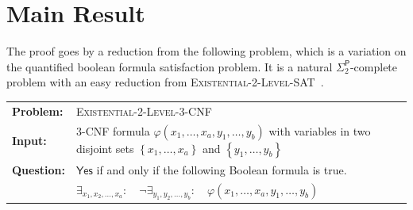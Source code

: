 \documentclass[a4paper,USenglish,cleveref,autoref,thm-restate,pdfa]{lipics-v2021}
\makeatletter
\newcommand{\defproblem}[4]{
  \begin{tcolorbox}%
    \nolinenumbers
    \hspace{0ex}\hspace*{-2.8ex}
    \begin{minipage}{0.99\textwidth}
      \vspace{0ex}\vspace*{-1ex}
      \begin{tabular}{@{}l@{~~}p{0.9\textwidth}@{}}
        {\sf\bfseries\color{gray} Problem:} & #1\\[.1ex]
        {\sf\bfseries\color{gray} Input:} & #2\\[.1ex]
        {\sf\bfseries\color{gray} #4:} & #3\\[-1ex]
      \end{tabular}
    \end{minipage}
  \end{tcolorbox}
}
\newcommand{\defdecproblem}[3]{\defproblem{#1}{#2}{#3}{Question}}
\newcommand{\PHS}[1]{\ensuremath{\Sigma^\mathsf{P}_{#1}}\xspace}
\newcommand{\SPTWO}{\PHS{2}}
\newcommand{\PSPTWO}{\textsc{Existential-}2\textsc{-Level-}3{-CNF}\xspace}
\newcommand{\PSPTWOSAT}{\textsc{Existential-}2\textsc{-Level-SAT}\xspace}
\newcommand{\set}[1]{\left\{#1\right\}}
\makeatother
\begin{document}
\section{Main Result}

The proof goes by a reduction from the following problem, which is a variation on the quantified boolean formula satisfaction problem.
It is a natural \SPTWO-complete problem with an easy reduction from \PSPTWOSAT~\cite{Stockmeyer76}.
\defdecproblem{\PSPTWO}{$3$-CNF formula $\varphi(x_1,\ldots,x_a,y_1,\ldots,y_b)$ with variables in two disjoint sets $\set{x_1,\ldots,x_a}$ and $\set{y_1,\ldots,y_b}$}{$\mathsf{Yes}$ if and only if the following Boolean formula is true.\\
 & $\exists_{x_1,x_2,\ldots,x_a}:\quad \neg \exists_{y_1,y_2,\ldots,y_b}:\quad \varphi(x_1,\ldots,x_a,y_1,\ldots,y_b)$}
\end{document}

